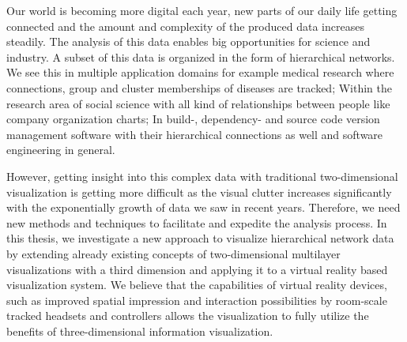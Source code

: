 Our world is becoming more digital each year, new parts of our daily life getting connected and the amount and complexity of the produced data increases steadily.
The analysis of this data enables big opportunities for science and industry.
A subset of this data is organized in the form of hierarchical networks. We see this in multiple application domains for example medical research where connections, group and cluster memberships of diseases are tracked; Within the research area of social science with all kind of relationships between people like company organization charts; In build-, dependency- and source code version management software with their hierarchical connections as well and software engineering in general.

However, getting insight into this complex data with traditional two-dimensional visualization is getting more difficult as the visual clutter increases significantly with the exponentially growth of data we saw in recent years. Therefore, we need new methods and techniques to facilitate and expedite the analysis process.
In this thesis, we investigate a new approach to visualize hierarchical network data by extending already existing concepts of two-dimensional multilayer visualizations with a third dimension and applying it to a virtual reality based visualization system. We believe that the capabilities of virtual reality devices, such as improved spatial impression and interaction possibilities by room-scale tracked headsets and controllers allows the visualization to fully utilize the benefits of three-dimensional information visualization.